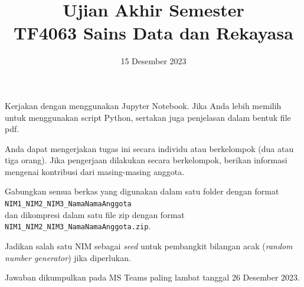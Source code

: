 \documentclass[a4paper,11pt]{article} %
\begin{document}
\title{Ujian Akhir Semester \\
TF4063 Sains Data dan Rekayasa}
\author{}
\date{15 Desember 2023}
\maketitle


Kerjakan dengan menggunakan Jupyter Notebook.
Jika Anda lebih memilih untuk menggunakan
script Python, sertakan juga penjelasan dalam bentuk file pdf.

Anda dapat mengerjakan tugas ini secara individu atau berkelompok (dua atau tiga orang).
Jika pengerjaan dilakukan secara berkelompok, berikan informasi mengenai kontribusi dari
masing-masing anggota.

Gabungkan semua berkas yang digunakan dalam satu folder dengan format\\
\texttt{NIM1\_NIM2\_NIM3\_NamaNamaAnggota}\\
dan dikompresi dalam satu file zip dengan format\\
\texttt{NIM1\_NIM2\_NIM3\_NamaNamaAnggota.zip}.

Jadikan salah satu NIM sebagai \textit{seed} untuk pembangkit bilangan acak
(\textit{random number generator}) jika diperlukan.

Jawaban dikumpulkan pada MS Teams paling lambat tanggal 26 Desember 2023.
\end{document}
